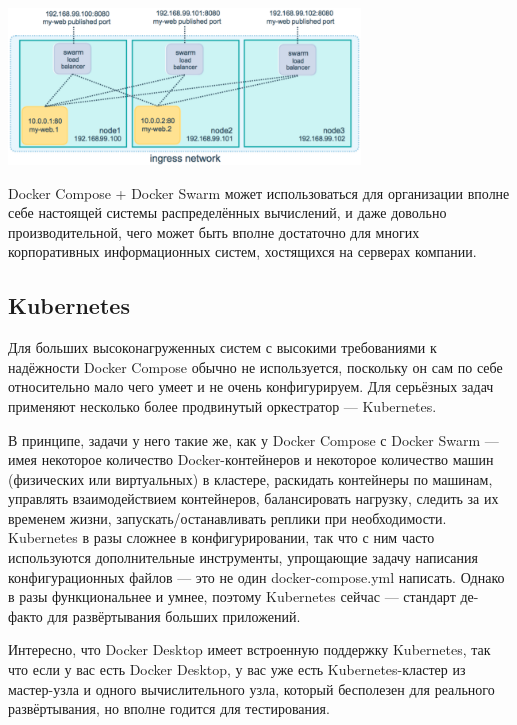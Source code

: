 \documentclass{../text-style}
\begin{document}
\begin{center}
    \includegraphics[width=0.7\textwidth]{swarmLoadBalancing.png}
\end{center}

Docker Compose + Docker Swarm может использоваться для организации вполне себе настоящей системы распределённых вычислений, и даже довольно производительной, чего может быть вполне достаточно для многих корпоративных информационных систем, хостящихся на серверах компании.

\subsection{Kubernetes}


Для больших высоконагруженных систем с высокими требованиями к надёжности Docker Compose обычно не используется, поскольку он сам по себе относительно мало чего умеет и не очень конфигурируем. Для серьёзных задач применяют несколько более продвинутый оркестратор --- Kubernetes. 

В принципе, задачи у него такие же, как у Docker Compose с Docker Swarm --- имея некоторое количество Docker-контейнеров и некоторое количество машин (физических или виртуальных) в кластере, раскидать контейнеры по машинам, управлять взаимодействием контейнеров, балансировать нагрузку, следить за их временем жизни, запускать/останавливать реплики при необходимости. Kubernetes в разы сложнее в конфигурировании, так что с ним часто используются дополнительные инструменты, упрощающие задачу написания конфигурационных файлов --- это не один docker-compose.yml написать. Однако в разы функциональнее и умнее, поэтому Kubernetes сейчас --- стандарт де-факто для развёртывания больших приложений. 

Интересно, что Docker Desktop имеет встроенную поддержку Kubernetes, так что если у вас есть Docker Desktop, у вас уже есть Kubernetes-кластер из мастер-узла и одного вычислительного узла, который бесполезен для реального развёртывания, но вполне годится для тестирования.
\end{document}
